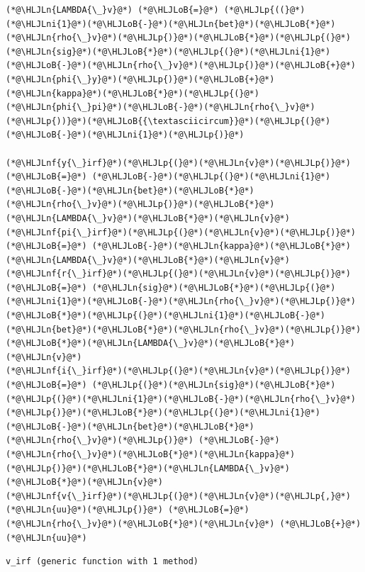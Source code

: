 \documentclass[12pt,a4paper]{article}
\newcommand{\HLJLn}[1]{#1}
\newcommand{\HLJLnf}[1]{\textcolor[RGB]{66,102,213}{#1}}
\newcommand{\HLJLni}[1]{\textcolor[RGB]{59,151,46}{#1}}
\newcommand{\HLJLoB}[1]{\textcolor[RGB]{102,102,102}{\textbf{#1}}}
\newcommand{\HLJLp}[1]{#1}
\begin{document}
\begin{lstlisting}
(*@\HLJLn{LAMBDA{\_}v}@*) (*@\HLJLoB{=}@*) (*@\HLJLp{((}@*)(*@\HLJLni{1}@*)(*@\HLJLoB{-}@*)(*@\HLJLn{bet}@*)(*@\HLJLoB{*}@*)(*@\HLJLn{rho{\_}v}@*)(*@\HLJLp{)}@*)(*@\HLJLoB{*}@*)(*@\HLJLp{(}@*)(*@\HLJLn{sig}@*)(*@\HLJLoB{*}@*)(*@\HLJLp{(}@*)(*@\HLJLni{1}@*)(*@\HLJLoB{-}@*)(*@\HLJLn{rho{\_}v}@*)(*@\HLJLp{)}@*)(*@\HLJLoB{+}@*)(*@\HLJLn{phi{\_}y}@*)(*@\HLJLp{)}@*)(*@\HLJLoB{+}@*)(*@\HLJLn{kappa}@*)(*@\HLJLoB{*}@*)(*@\HLJLp{(}@*)(*@\HLJLn{phi{\_}pi}@*)(*@\HLJLoB{-}@*)(*@\HLJLn{rho{\_}v}@*)(*@\HLJLp{))}@*)(*@\HLJLoB{{\textasciicircum}}@*)(*@\HLJLp{(}@*)(*@\HLJLoB{-}@*)(*@\HLJLni{1}@*)(*@\HLJLp{)}@*)

(*@\HLJLnf{y{\_}irf}@*)(*@\HLJLp{(}@*)(*@\HLJLn{v}@*)(*@\HLJLp{)}@*) (*@\HLJLoB{=}@*) (*@\HLJLoB{-}@*)(*@\HLJLp{(}@*)(*@\HLJLni{1}@*)(*@\HLJLoB{-}@*)(*@\HLJLn{bet}@*)(*@\HLJLoB{*}@*)(*@\HLJLn{rho{\_}v}@*)(*@\HLJLp{)}@*)(*@\HLJLoB{*}@*)(*@\HLJLn{LAMBDA{\_}v}@*)(*@\HLJLoB{*}@*)(*@\HLJLn{v}@*)
(*@\HLJLnf{pi{\_}irf}@*)(*@\HLJLp{(}@*)(*@\HLJLn{v}@*)(*@\HLJLp{)}@*) (*@\HLJLoB{=}@*) (*@\HLJLoB{-}@*)(*@\HLJLn{kappa}@*)(*@\HLJLoB{*}@*)(*@\HLJLn{LAMBDA{\_}v}@*)(*@\HLJLoB{*}@*)(*@\HLJLn{v}@*)
(*@\HLJLnf{r{\_}irf}@*)(*@\HLJLp{(}@*)(*@\HLJLn{v}@*)(*@\HLJLp{)}@*) (*@\HLJLoB{=}@*) (*@\HLJLn{sig}@*)(*@\HLJLoB{*}@*)(*@\HLJLp{(}@*)(*@\HLJLni{1}@*)(*@\HLJLoB{-}@*)(*@\HLJLn{rho{\_}v}@*)(*@\HLJLp{)}@*)(*@\HLJLoB{*}@*)(*@\HLJLp{(}@*)(*@\HLJLni{1}@*)(*@\HLJLoB{-}@*)(*@\HLJLn{bet}@*)(*@\HLJLoB{*}@*)(*@\HLJLn{rho{\_}v}@*)(*@\HLJLp{)}@*)(*@\HLJLoB{*}@*)(*@\HLJLn{LAMBDA{\_}v}@*)(*@\HLJLoB{*}@*)(*@\HLJLn{v}@*)
(*@\HLJLnf{i{\_}irf}@*)(*@\HLJLp{(}@*)(*@\HLJLn{v}@*)(*@\HLJLp{)}@*) (*@\HLJLoB{=}@*) (*@\HLJLp{(}@*)(*@\HLJLn{sig}@*)(*@\HLJLoB{*}@*)(*@\HLJLp{(}@*)(*@\HLJLni{1}@*)(*@\HLJLoB{-}@*)(*@\HLJLn{rho{\_}v}@*)(*@\HLJLp{)}@*)(*@\HLJLoB{*}@*)(*@\HLJLp{(}@*)(*@\HLJLni{1}@*)(*@\HLJLoB{-}@*)(*@\HLJLn{bet}@*)(*@\HLJLoB{*}@*)(*@\HLJLn{rho{\_}v}@*)(*@\HLJLp{)}@*) (*@\HLJLoB{-}@*) (*@\HLJLn{rho{\_}v}@*)(*@\HLJLoB{*}@*)(*@\HLJLn{kappa}@*)(*@\HLJLp{)}@*)(*@\HLJLoB{*}@*)(*@\HLJLn{LAMBDA{\_}v}@*)(*@\HLJLoB{*}@*)(*@\HLJLn{v}@*)
(*@\HLJLnf{v{\_}irf}@*)(*@\HLJLp{(}@*)(*@\HLJLn{v}@*)(*@\HLJLp{,}@*)(*@\HLJLn{uu}@*)(*@\HLJLp{)}@*) (*@\HLJLoB{=}@*) (*@\HLJLn{rho{\_}v}@*)(*@\HLJLoB{*}@*)(*@\HLJLn{v}@*) (*@\HLJLoB{+}@*) (*@\HLJLn{uu}@*)
\end{lstlisting}

\begin{lstlisting}
v_irf (generic function with 1 method)
\end{lstlisting}
\end{document}
